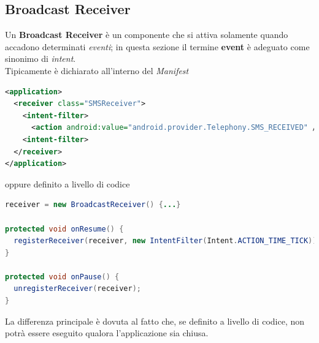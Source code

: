 \documentclass{article}
\begin{document}
\subsection*{Broadcast Receiver}
Un \textbf{Broadcast Receiver} è un componente che si attiva solamente quando accadono determinati \textit{eventi}; in questa sezione il termine \textbf{event} è adeguato come sinonimo di \textit{intent}.\vspace*{7pt}\\
Tipicamente è dichiarato all'interno del \textit{Manifest}
\begin{lstlisting}[language=XML]
<application>
  <receiver class="SMSReceiver">
    <intent-filter>
      <action android:value="android.provider.Telephony.SMS_RECEIVED" />
    <intent-filter>
  </receiver>
</application>
\end{lstlisting}
oppure definito a livello di codice
\begin{lstlisting}[language=JAVA]
receiver = new BroadcastReceiver() {...}

protected void onResume() {
  registerReceiver(receiver, new IntentFilter(Intent.ACTION_TIME_TICK));
}

protected void onPause() {
  unregisterReceiver(receiver);
}
\end{lstlisting}    
La differenza principale è dovuta al fatto che, se definito a livello di codice, non potrà essere eseguito qualora l'applicazione sia chiusa.
\end{document}
